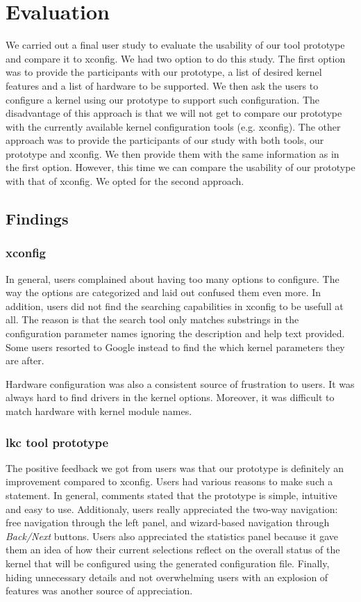 \documentclass{chi2009}
\begin{document}
\section{Evaluation}\label{sec:evaluation}
We carried out a final user study to evaluate the usability of our tool prototype and compare it to \textsf{xconfig}. We had two option to do this study. The
first option was to provide the participants with our prototype, a list of desired kernel features and a list of hardware to be supported. We then ask the users
to configure a kernel using our prototype to support such configuration. The disadvantage of this approach is that we will not get to compare our prototype
with the currently available kernel configuration tools (e.g. \textsf{xconfig}). The other approach was to provide the participants of our study with both
tools, our prototype and \textsf{xconfig}. We then provide them with the same information as in the first option. However, this time we can compare the
usability of our prototype with that of \textsf{xconfig}. We opted for the second approach.

\subsection{Findings}
\subsubsection{\textsf{xconfig}}
In general, users complained about having too many options to configure. The way the options are categorized and laid out confused them even more. In addition,
users did not find the searching capabilities in \textsf{xconfig} to be usefull at all. The reason is that the search tool only matches substrings in the
configuration parameter names ignoring the description and help text provided. Some users resorted to Google instead to find the which kernel parameters they
are after.

Hardware configuration was also a consistent source of frustration to users. It was always hard to find drivers in the kernel options. Moreover, it was
difficult to match hardware with kernel module names.

\subsubsection{\textsf{lkc tool prototype}}
The positive feedback we got from users was that our prototype is definitely an improvement compared to \textsf{xconfig}. Users had various reasons to make such
a statement. In general, comments stated that the prototype is simple, intuitive and easy to use. Additionaly, users really appreciated the two-way navigation:
free navigation through the left panel, and wizard-based navigation through \textit{Back/Next} buttons. Users also appreciated the statistics panel because it
gave them an idea of how their current selections reflect on the overall status of the kernel that will be configured using the generated configuration file.
Finally, hiding unnecessary details and not overwhelming users with an explosion of features was another source of appreciation.
\end{document}
